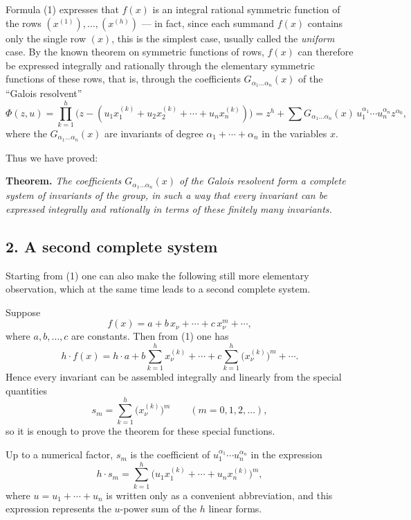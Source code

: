 \documentclass[11pt]{article}
\begin{document}
Formula \textup{(1)} expresses that $f(x)$ is an integral rational symmetric function of the rows $(x^{(1)}),\dots,(x^{(h)})$ --- in fact, since each summand $f(x)$ contains only the single row $(x)$, this is the simplest case, usually called the \emph{uniform} case. By the known theorem on symmetric functions of rows, $f(x)$ can therefore be expressed integrally and rationally through the elementary symmetric functions of these rows, that is, through the coefficients $G_{\alpha_1\dots\alpha_n}(x)$ of the ``Galois resolvent''
\[
\Phi(z,u)=\prod_{k=1}^h\bigl(z-(u_1x^{(k)}_1+u_2x^{(k)}_2+\cdots+u_nx^{(k)}_n)\bigr)
      = z^h+\sum G_{\alpha_1\dots\alpha_n}(x)\,u_1^{\alpha_1}\cdots u_n^{\alpha_n} z^{\alpha_0},
\tag{2}
\]
where the $G_{\alpha_1\dots\alpha_n}(x)$ are invariants of degree $\alpha_1+\cdots+\alpha_n$ in the variables $x$.

Thus we have proved:

\medskip
\noindent
\textbf{Theorem.}
\emph{The coefficients $G_{\alpha_1\dots\alpha_n}(x)$ of the Galois resolvent form a complete system of invariants of the group, in such a way that every invariant can be expressed integrally and rationally in terms of these finitely many invariants.}

\subsection*{2. A second complete system}

Starting from \textup{(1)} one can also make the following still more elementary observation, which at the same time leads to a second complete system.

Suppose
\[
f(x)=a+b\,x_\nu+\cdots+c\,x_\nu^m+\cdots,
\]
where $a,b,\dots,c$ are constants. Then from \textup{(1)} one has
\[
h\cdot f(x)
 = h\cdot a
   + b\sum_{k=1}^h x^{(k)}_\nu
   + \cdots
   + c\sum_{k=1}^h \bigl(x^{(k)}_\nu\bigr)^m
   + \cdots.
\]
Hence every invariant can be assembled integrally and linearly from the special quantities
\[
s_m=\sum_{k=1}^h \bigl(x^{(k)}_\nu\bigr)^m
\qquad (m=0,1,2,\dots),
\]
so it is enough to prove the theorem for these special functions.

Up to a numerical factor, $s_m$ is the coefficient of $u_1^{\alpha_1}\cdots u_n^{\alpha_n}$ in the expression
\[
h\cdot s_m=\sum_{k=1}^h\bigl(u_1x^{(k)}_1+\cdots+u_nx^{(k)}_n\bigr)^m,
\]
where $u=u_1+\cdots+u_n$ is written only as a convenient abbreviation, and this expression represents the $u$-power sum of the $h$ linear forms.
\end{document}
